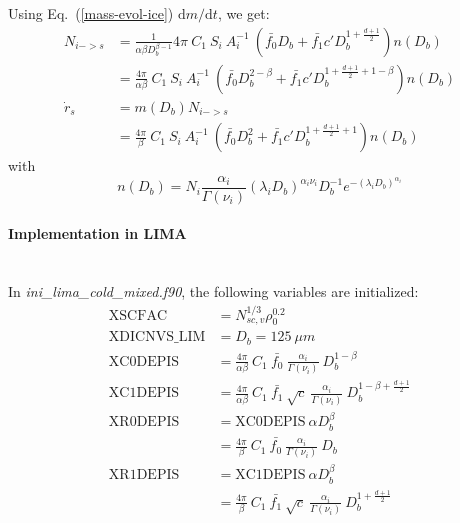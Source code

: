{Using Eq.\ (\ref{mass-evol-ice}) $\mathrm{d}m/\mathrm{d}t$, we get:
\begin{align}
 N_{i->s} &= \frac{1}{\alpha\beta D_b^{\beta -1}} 4\pi ~ C_1 ~ S_i ~ A_i^{-1} ~ ( \bar{f_0} D_b + \bar{f_1} c' D_b^{1+\frac{d+1}{2}} ) n(D_b) \\
 &= \frac{4\pi}{\alpha\beta} ~ C_1 ~ S_i ~ A_i^{-1} ~ ( \bar{f_0} D_b^{2-\beta} + \bar{f_1} c' D_b^{1+\frac{d+1}{2}+1-\beta} ) n(D_b)     \\
 \dot{r}_s &= m(D_b)N_{i->s} \\
 &= \frac{4\pi}{\beta} ~ C_1 ~ S_i ~ A_i^{-1} ~ ( \bar{f_0} D_b^{2} + \bar{f_1} c' D_b^{1+\frac{d+1}{2}+1} ) n(D_b)    \label{rpoint-harrington}
\end{align}
with
\begin{equation}
 n(D_b) = N_i \frac{\alpha_i}{\Gamma(\nu_i)} (\lambda_iD_b)^{\alpha_i\nu_i} D_b^{-1} e^{-(\lambda_iD_b)^{\alpha_i}}
\end{equation}

\paragraph{Implementation in LIMA}
~\\
In \emph{ini\_lima\_cold\_mixed.f90}, the following variables are initialized:
\begin{align}
 \mathrm{XSCFAC} &= N_{sc,v}^{1/3} \rho_0^{0.2} \\
 \mathrm{XDICNVS\_LIM} &= D_b = 125 ~ \mu m \\
 \mathrm{XC0DEPIS} &= \frac{4\pi}{\alpha\beta} ~ C_1 ~ \bar{f_0} ~ \frac{\alpha_i}{\Gamma(\nu_i)} ~ D_b^{1-\beta}   \\
 \mathrm{XC1DEPIS} &= \frac{4\pi}{\alpha\beta} ~ C_1 ~ \bar{f_1} ~ \sqrt{c} ~ \frac{\alpha_i}{\Gamma(\nu_i)} ~ D_b^{1-\beta+\frac{d+1}{2}}   \\
 \mathrm{XR0DEPIS} &= \mathrm{XC0DEPIS} ~ \alpha D_b^\beta \\
          &= \frac{4\pi}{\beta} ~ C_1 ~ \bar{f_0} ~ \frac{\alpha_i}{\Gamma(\nu_i)} ~ D_b   \\
 \mathrm{XR1DEPIS} &= \mathrm{XC1DEPIS} ~ \alpha D_b^\beta \\
          &= \frac{4\pi}{\beta} ~ C_1 ~ \bar{f_1} ~ \sqrt{c} ~ \frac{\alpha_i}{\Gamma(\nu_i)} ~ D_b^{1+\frac{d+1}{2}}   \\
\end{align}

}
